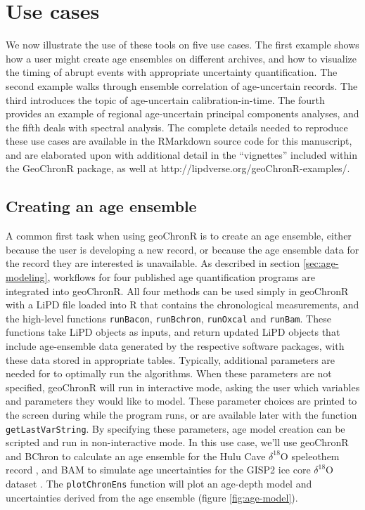 \documentclass[gchron, manuscript]{copernicus}
\begin{document}
\hypertarget{sec:use-cases}{%
\section{Use cases}\label{sec:use-cases}}

We now illustrate the use of these tools on five use cases.
The first example shows how a user might create age ensembles on different archives, and how to visualize the timing of abrupt events with appropriate uncertainty quantification.
The second example walks through ensemble correlation of age-uncertain records.
The third introduces the topic of age-uncertain calibration-in-time.
The fourth provides an example of regional age-uncertain principal components analyses, and the fifth deals with spectral analysis.
The complete details needed to reproduce these use cases are available in the RMarkdown source code for this manuscript, and are elaborated upon with additional detail in the ``vignettes'' included within the GeoChronR package, as well at http://lipdverse.org/geoChronR-examples/.

\subsection{Creating an age ensemble}

A common first task when using geoChronR is to create an age ensemble, either because the user is developing a new record, or because the age ensemble data for the record they are interested is unavailable.
As described in section \ref{sec:age-modeling}, workflows for four published age quantification programs are integrated into geoChronR.
All four methods can be used simply in geoChronR with a LiPD file loaded into R that contains the chronological measurements, and the high-level functions \texttt{runBacon}, \texttt{runBchron}, \texttt{runOxcal} and \texttt{runBam}.
These functions take LiPD objects as inputs, and return updated LiPD objects that include age-ensemble data generated by the respective software packages, with these data stored in appropriate tables.
Typically, additional parameters are needed for to optimally run the algorithms.
When these parameters are not specified, geoChronR will run in interactive mode, asking the user which variables and parameters they would like to model.
These parameter choices are printed to the screen during while the program runs, or are available later with the function \texttt{getLastVarString}.
By specifying these parameters, age model creation can be scripted and run in non-interactive mode.
In this use case, we'll use geoChronR and BChron \citep{parnell2008flexible} to calculate an age ensemble for the Hulu Cave \(\delta^{18}\)O speleothem record \citep{hulu2001}, and BAM \citep{BAM} to simulate age uncertainties for the GISP2 ice core \(\delta^{18}\)O dataset \citep{alley2000}.
The \texttt{plotChronEns} function will plot an age-depth model and uncertainties derived from the age ensemble (figure \ref{fig:age-model}).
\end{document}
